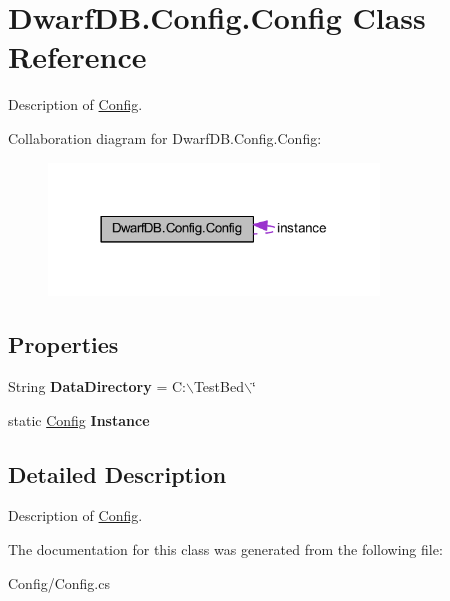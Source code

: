 \hypertarget{class_dwarf_d_b_1_1_config_1_1_config}{
\section{DwarfDB.Config.Config Class Reference}
\label{class_dwarf_d_b_1_1_config_1_1_config}
}


Description of \hyperlink{class_dwarf_d_b_1_1_config_1_1_config}{Config}.  




Collaboration diagram for DwarfDB.Config.Config:\nopagebreak
\begin{figure}[H]
\begin{center}
\leavevmode
\includegraphics[width=249pt]{class_dwarf_d_b_1_1_config_1_1_config__coll__graph}
\end{center}
\end{figure}
\subsection*{Properties}
\begin{DoxyCompactItemize}
\item 
\hypertarget{class_dwarf_d_b_1_1_config_1_1_config_afcb080c4360c0c344d2b9d9ecb72c297}{
String {\bfseries DataDirectory} = C:$\backslash$TestBed$\backslash$\char`\"{}}
\label{class_dwarf_d_b_1_1_config_1_1_config_afcb080c4360c0c344d2b9d9ecb72c297}

\item 
\hypertarget{class_dwarf_d_b_1_1_config_1_1_config_af1db0cd463b4f00c1a1b7fd4373b230a}{
static \hyperlink{class_dwarf_d_b_1_1_config_1_1_config}{Config} {\bfseries Instance}}
\label{class_dwarf_d_b_1_1_config_1_1_config_af1db0cd463b4f00c1a1b7fd4373b230a}

\end{DoxyCompactItemize}


\subsection{Detailed Description}
Description of \hyperlink{class_dwarf_d_b_1_1_config_1_1_config}{Config}. 

The documentation for this class was generated from the following file:\begin{DoxyCompactItemize}
\item 
Config/Config.cs\end{DoxyCompactItemize}
